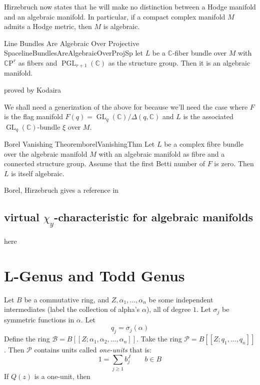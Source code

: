 \documentclass{book}
\newcommand{\C}{{\mathbb{C}}}
\newcommand{\CB}{{\mathcal{B}}}
\newcommand{\CCP}{{\mathcal{P}}}
\newcommand{\CP}{\mathbb{C}\mathrm{P}}
\newcommand{\GL}{{\operatorname{GL}}}
\newcommand{\PGL}{{\operatorname{PGL}}}
\begin{document}
Hirzebruch now states that he will make no distinction between a Hodge manifold and an algebraic manifold. In
particular, if a compact complex manifold $M$ admits a Hodge metric, then $M$ is algebraic.

\begin{thm}{Line Bundles Are Algebraic Over Projective Space}{lineBundlesAreAlgebraicOverProjSp}
  let $L$ be a $\C$-fiber bundle over $M$ with $\CP^r$ as fibers and $\PGL_{r+1}(\C)$ as the structure group.
  Then it is an algebraic manifold.
\end{thm}

\begin{Proof}
  proved by Kodaira
\end{Proof}


We shall need a generization of the above for because we'll need the case where $F$ is the flag manifold $F(q)
= \GL_q(\C)/\Delta(q,\C)$ and $L$ is the associated $\GL_q(\C)$-bundle $\xi$ over $M$.


\begin{thm}{Borel Vanishing Theorem}{borelVanishingThm}
  Let $L$ be a complex fibre bundle over the algebraic manifold $M$ with an algebraic manifold as fibre
  and a connected structure group. Assume that the first Betti number of $F$ is zero. Then $L$ is itself
  algebraic.
\end{thm}

\begin{Proof}
  Borel, Hirzebruch gives a reference in~\cite[141]{hirzebruchTopologicalMethodsAlgebraic1995}
\end{Proof}





\subsection{virtual $\chi_y$-characteristic for algebraic manifolds}\label{sec:virtualEulerCharOnProjVar}

here

\section{L-Genus and Todd Genus}


Let $B$ be a commutative ring, and $Z, \alpha_1, ..., \alpha_n$ be some independent intermediates (label the
collection of alpha's $\alpha$), all of
degree $1$. Let $\sigma_j$ be symmetric functions in $\alpha$. Let
\[
  q_j = \sigma_j(\alpha)
\]
Define the ring $\CB = B[[Z; \alpha_1, \alpha_2, ..., \alpha_n]]$. Take the ring $\CCP = B[[Z; q_1, ...,
q_n]]$. Then $\CCP$ contains units called \emph{one-units} that is:
\[
  1 = \sum_{j\ge 1} b_j^J \qquad b \in B
\]
If $Q(z)$ is a one-unit, then
\end{document}
